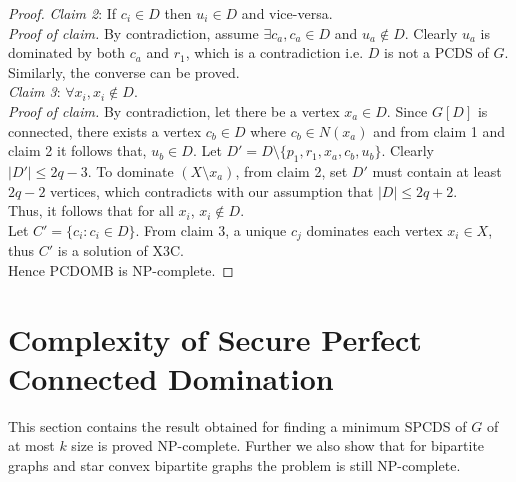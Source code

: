 \begin{theorem}
\begin{proof}
{\textit{Claim 2}:} If $c_i \in D$ then $u_i \in D$ and vice-versa.\\
\textit{Proof of claim.} By contradiction, assume $\exists c_a, c_a\in D$ and $u_a \notin D$. Clearly $u_a$ is dominated by both $c_a$ and $r_1$, which is a contradiction i.e. $D$ is not a PCDS of $G$. Similarly, the converse can be proved.\\
{\textit{Claim 3}:} $\forall x_i, x_i \notin D$.\\
\textit{Proof of claim.} By contradiction, let there be a vertex $x_a \in D$. Since $G[D]$ is connected, there exists a vertex $c_b \in D$ where $c_b \in N(x_a)$ and from claim 1 and claim 2 it follows that, $u_b \in D$. Let $D' = D\setminus \lbrace p_1,r_1,x_a,c_b,u_b \rbrace$. Clearly $|D'| \leq 2q-3$. To dominate $(X\setminus x_a)$, from claim 2, set $D'$ must contain at least $2q-2$ vertices, which contradicts with our assumption that $|D| \leq 2q+2$.\\
Thus, it follows that for all $x_i$, $x_i \notin D$.\\
Let $C'=\lbrace c_i : c_i \in D \rbrace$. From claim 3, a unique $c_j$ dominates each vertex $x_i \in X$, thus $C'$ is a solution of X3C.\\
Hence PCDOMB is NP-complete.
\end{proof}
\end{theorem}
\section{Complexity of Secure Perfect Connected Domination}
\noindent
This section contains the result obtained for finding a minimum SPCDS of $G$ of at most $k$ size is proved NP-complete. Further we also show that for bipartite graphs and star convex bipartite graphs the problem is still NP-complete.
